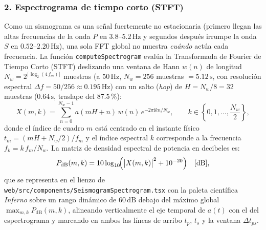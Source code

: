 \documentclass[11pt,a4paper]{article}
\newcommand{\src}[1]{\nolinkurl{#1}}
\newcommand{\unit}[1]{\mathrm{#1}}
\begin{document}
\subsubsection*{2. Espectrograma de tiempo corto (STFT)}
Como un sismograma es una señal fuertemente no estacionaria (primero llegan las altas frecuencias de la onda $P$
en $3.8\text{--}5.2\,\unit{Hz}$ y segundos después irrumpe la onda $S$ en $0.52\text{--}2.20\,\unit{Hz}$), una
 sola FFT global no muestra \emph{cuándo} actúa cada frecuencia. La función \texttt{computeSpectrogram} evalúa la
Transformada de Fourier de Tiempo Corto (STFT) deslizando una ventana de Hann $w(n)$ de longitud
$N_w = 2^{\lceil\log_2(4\,f_m)\rceil}$ muestras (a $50\,\unit{Hz}$, $N_w = 256$ muestras $= 5.12\,\unit{s}$, con
resolución espectral $\Delta f = 50/256 \approx 0.195\,\unit{Hz}$) con un salto (\emph{hop}) de
$H = N_w / 8 = 32$ muestras ($0.64\,\unit{s}$, traslape del $87.5\,\text{\%}$):
\begin{equation}
  X(m,k) = \sum_{n=0}^{N_w - 1} a(mH + n)\,w(n)\,e^{-2\pi\mathrm{i}kn/N_w},
  \qquad
  k \in \left\{0,1,\ldots,\frac{N_w}{2}\right\},
  \label{eq:stft-definicion}
\end{equation}
donde el índice de cuadro $m$ está centrado en el instante físico
$t_m = (mH + N_w/2)/f_m$ y el índice espectral $k$ corresponde a la frecuencia $f_k = k\,f_m/N_w$. La matriz de
densidad espectral de potencia en decibeles es:
\begin{equation}
  P_{\mathrm{dB}}(m,k) = 10\log_{10}\!\Bigl(\bigl|X(m,k)\bigr|^2 + 10^{-20}\Bigr)\quad[\unit{dB}],
  \label{eq:stft-db}
\end{equation}
que se representa en el lienzo de \src{web/src/components/SeismogramSpectrogram.tsx} con la paleta científica
\emph{Inferno} sobre un rango dinámico de $60\,\unit{dB}$ debajo del máximo global $\max_{m,k} P_{\mathrm{dB}}(m,k)$,
alineando verticalmente el eje temporal de $a(t)$ con el del espectrograma y marcando en ambos las líneas de
arribo $t_p$, $t_s$ y la ventana $\Delta t_{ps}$.
\end{document}
